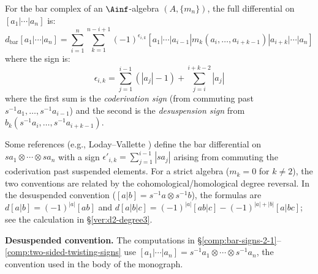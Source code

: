 \begin{proposition}
\label{prop:master-sign}
For the bar complex of an $\Ainf$-algebra $(A, \{m_n\})$, the full differential
on $[a_1|\cdots|a_n]$ is:
\[
d_{\mathrm{bar}}[a_1|\cdots|a_n] = \sum_{i=1}^{n} \sum_{k=1}^{n-i+1}
(-1)^{\epsilon_{i,k}} [a_1|\cdots|a_{i-1}|m_k(a_i, \ldots, a_{i+k-1})|a_{i+k}|\cdots|a_n]
\]
where the sign is:
\[
\epsilon_{i,k} = \sum_{j=1}^{i-1} (|a_j| - 1) + \sum_{j=i}^{i+k-2} |a_j|
\]
where the first sum is the \emph{coderivation sign} (from commuting past
$s^{-1}a_1, \ldots, s^{-1}a_{i-1}$) and the second is the \emph{desuspension sign}
from $b_k(s^{-1}a_i, \ldots, s^{-1}a_{i+k-1})$.

\begin{remark}
Some references (e.g., Loday--Vallette \cite{LV12}) define the bar differential
on $sa_1 \otimes \cdots \otimes sa_n$ with a sign
$\epsilon'_{i,k} = \sum_{j=1}^{i-1}|sa_j|$ arising from commuting the coderivation past
suspended elements. For a strict algebra ($m_k = 0$ for $k \neq 2$), the two conventions
are related by the cohomological/homological degree reversal. In the
desuspended convention ($[a|b] = s^{-1}a \otimes s^{-1}b$), the formulas are
$d[a|b] = (-1)^{|a|}[ab]$ and $d[a|b|c] = (-1)^{|a|}[ab|c] - (-1)^{|a|+|b|}[a|bc]$; see the calculation in \S\ref{ver:d2-degree3}.
\end{remark}
\end{proposition}

\medskip
\noindent\textbf{Desuspended convention.} The computations in
\S\ref{comp:bar-signs-2-1}--\ref{comp:two-sided-twisting-signs} use
$[a_1|\cdots|a_n]=s^{-1}a_1\otimes\cdots\otimes s^{-1}a_n$, the
convention used in the body of the monograph.

